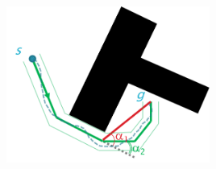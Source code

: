 \documentclass[default]{beamer}
\begin{document}
\begin{frame}
\begin{columns}
\begin{column}{0.3\textwidth}
				\vspace{10pt}
				\includegraphics[width=0.5\textwidth]{strl/angl_constr_planning}
			\end{column}
		\end{columns}			
		\par\bigskip

		\nocite{*}
		\printbibliography[keyword={pathplan}, resetnumbers=true]

	\end{frame}
	
\end{document}
